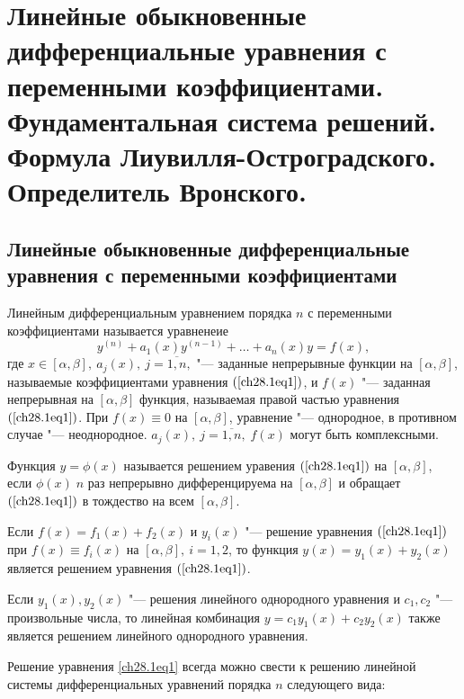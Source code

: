 \chapter{Линейные обыкновенные дифференциальные уравнения с переменными коэффициентами. Фундаментальная система решений. Формула Лиувилля-Остроградского. Определитель Вронского.}

\section{Линейные обыкновенные дифференциальные уравнения с переменными коэффициентами}

Линейным дифференциальным уравнением порядка $n$ с переменными коэффициентами называется уравненеие 
\begin{equation} \label{ch28.1eq1}
y^{(n)} + a_1(x)y^{(n - 1)} + \ldots + a_n(x)y = f(x),
\end{equation}
где $x \in [\alpha, \beta], \: a_j(x), \: j = \overline{1,n},$ "--- заданные непрерывные функции на $[\alpha, \beta]$, называемые коэффициентами уравнения $(\ref{ch28.1eq1})$, и $f(x)$ "--- заданная непрерывная на $[\alpha, \beta]$ функция, называемая правой частью уравнения $(\ref{ch28.1eq1})$. При $f(x) \equiv 0$ на $[\alpha, \beta]$, уравнение "--- однородное, в противном случае "--- неоднородное. $a_j(x), \: j = \overline{1,n}, \; f(x)$ могут быть комплексными.

Функция $y = \phi(x)$ называется решением уравения $(\ref{ch28.1eq1})$ на $[\alpha, \beta]$, если $\phi(x) \; n$ раз непрерывно дифференцируема на $[\alpha, \beta]$ и обращает $(\ref{ch28.1eq1})$ в тождество на всем $[\alpha, \beta]$.

\begin{lemm}
Если $f(x) = f_1(x) + f_2(x)$ и $y_i(x)$ "--- решение уравнения $(\ref{ch28.1eq1})$ при $f(x) \equiv f_i(x)$ на $[\alpha, \beta], \: i = 1,2$, то функция $y(x) = y_1(x) + y_2(x)$ является решением уравнения $(\ref{ch28.1eq1})$.
\end{lemm}  

\begin{cons}
Если $y_1(x), y_2(x)$ "--- решения линейного однородного уравнения и $c_1, c_2$ "--- произвольные числа, то линейная комбинация $y = c_1y_1(x) + c_2y_2(x)$ также является решением линейного однородного уравнения.
\end{cons}

Решение уравнения \eqref{ch28.1eq1} всегда можно свести к решению линейной системы дифференциальных уравнений порядка $n$ следующего вида:

